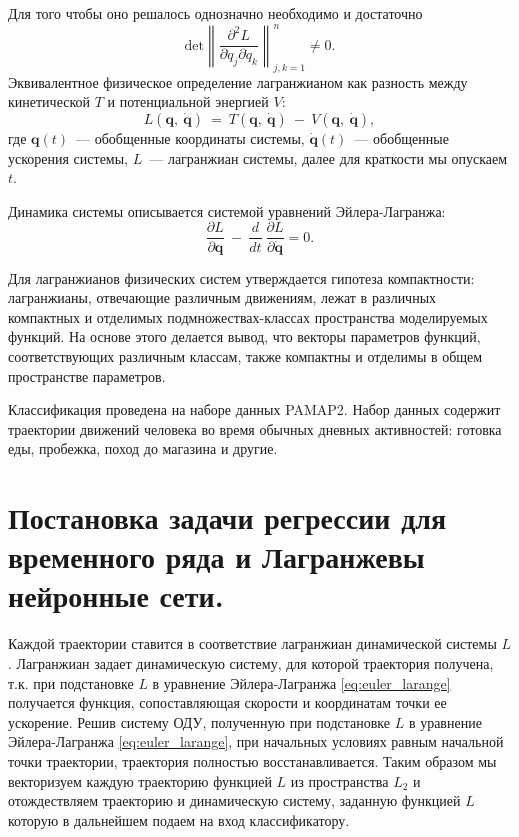 \documentclass[12pt, twoside]{article}
\begin{document}
Для того чтобы оно решалось однозначно необходимо и достаточно
\begin{equation}
    \text{det} \left \| \frac{\partial^{2} L}{\partial \dot{q}_{j}\partial \dot{q}_{k}} \right \|_{j,k=1}^{n} \neq 0.
\end{equation}
Эквивалентное физическое определение лагранжианом как разность между кинетической $T$ и потенциальной энергией $V$: 
\begin{equation}
L\left(\mathbf{q},\ \dot{\mathbf{q}}\right) \ =\ T\left(\mathbf{q},\ \dot{\mathbf{q}}\right)\ -\ V\left(\mathbf{q},\ \dot{\mathbf{q}}\right), 
\end{equation}
где $\mathbf{q}(t)$~--- обобщенные координаты системы, $\dot{\mathbf{q}}(t)$~--- обобщенные ускорения системы, $L$~--- лагранжиан системы, далее для краткости мы опускаем $t$.

Динамика системы описывается системой уравнений Эйлера-Лагранжа:
\begin{equation}
\frac{\partial L}{\partial\mathbf{q}}\ -\ \frac{d}{dt}\ \frac{\partial L}{\partial\dot{\mathbf{q}}}=0. \label{eq:euler_larange}
\end{equation}

Для лагранжианов физических систем утверждается гипотеза компактности: лагранжианы, отвечающие различным движениям, лежат в различных компактных и отделимых подмножествах-классах пространства моделируемых функций. На основе этого делается вывод, что векторы параметров функций, соответствующих различным классам, также компактны и отделимы в общем пространстве параметров. 

Классификация проведена на наборе данных PAMAP2. Набор данных содержит траектории движений человека во время обычных дневных активностей: готовка еды, пробежка, поход до магазина и другие.

\section{Постановка задачи регрессии для временного ряда и  Лагранжевы нейронные сети.} \label{sec:regression}

Каждой траектории ставится в соответствие лагранжиан динамической системы $L$. Лагранжиан задает динамическую систему, для которой траектория получена, т.к. при подстановке $L$ в уравнение Эйлера-Лагранжа \eqref{eq:euler_larange} получается функция, сопоставляющая скорости и координатам точки ее ускорение. Решив систему ОДУ, полученную при подстановке $L$ в уравнение Эйлера-Лагранжа \eqref{eq:euler_larange}, при начальных условиях равным начальной точки траектории, траектория полностью восстанавливается. Таким образом мы векторизуем каждую траекторию функцией $L$ из пространства $L_2$ и отождествляем траекторию и динамическую систему, заданную функцией  $L$ которую в дальнейшем подаем на вход классификатору.
\end{document}
